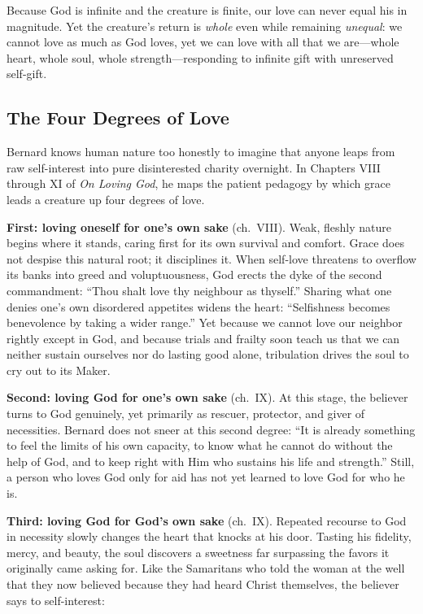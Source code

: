 Because God is infinite and the creature is finite, our love can never equal his in magnitude. Yet the creature's return is \emph{whole} even while remaining \emph{unequal}: we cannot love as much as God loves, yet we can love with all that we are---whole heart, whole soul, whole strength---responding to infinite gift with unreserved self-gift.

\subsection*{The Four Degrees of Love}

Bernard knows human nature too honestly to imagine that anyone leaps from raw self-interest into pure disinterested charity overnight. In Chapters VIII through XI of \emph{On Loving God}, he maps the patient pedagogy by which grace leads a creature up four degrees of love.

\textbf{First: loving oneself for one's own sake} (ch.\ VIII). Weak, fleshly nature begins where it stands, caring first for its own survival and comfort. Grace does not despise this natural root; it disciplines it. When self-love threatens to overflow its banks into greed and voluptuousness, God erects the dyke of the second commandment: ``Thou shalt love thy neighbour as thyself.'' Sharing what one denies one's own disordered appetites widens the heart: ``Selfishness becomes benevolence by taking a wider range.'' Yet because we cannot love our neighbor rightly except in God, and because trials and frailty soon teach us that we can neither sustain ourselves nor do lasting good alone, tribulation drives the soul to cry out to its Maker.

\textbf{Second: loving God for one's own sake} (ch.\ IX). At this stage, the believer turns to God genuinely, yet primarily as rescuer, protector, and giver of necessities. Bernard does not sneer at this second degree: ``It is already something to feel the limits of his own capacity, to know what he cannot do without the help of God, and to keep right with Him who sustains his life and strength.'' Still, a person who loves God only for aid has not yet learned to love God for who he is.

\textbf{Third: loving God for God's own sake} (ch.\ IX). Repeated recourse to God in necessity slowly changes the heart that knocks at his door. Tasting his fidelity, mercy, and beauty, the soul discovers a sweetness far surpassing the favors it originally came asking for. Like the Samaritans who told the woman at the well that they now believed because they had heard Christ themselves, the believer says to self-interest:

